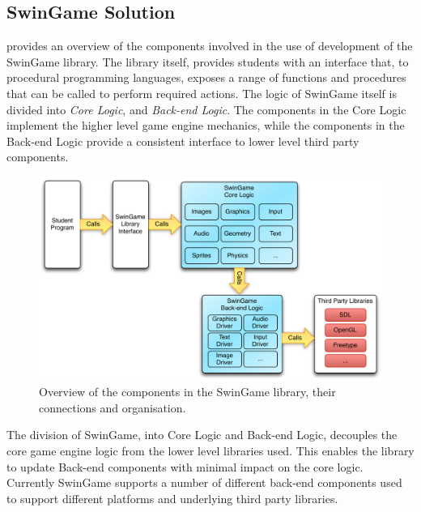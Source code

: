\clearpage
\subsection{SwinGame Solution} %
\label{sub:swingame_solution}


 provides an overview of the components involved in the use of development of the SwinGame library. The library itself, provides students with an interface that, to procedural programming languages, exposes a range of functions and procedures that can be called to perform required actions. The logic of SwinGame itself is divided into \emph{Core Logic}, and \emph{Back-end Logic}. The components in the Core Logic implement the higher level game engine mechanics, while the components in the Back-end Logic provide a consistent interface to lower level third party components.

\begin{figure}[htbp]
  \centering
  \includegraphics[width=\textwidth]{SwinGameOverview}
  \caption{Overview of the components in the SwinGame library, their connections and organisation.}
  \label{fig:swingame_overview}
\end{figure}

The division of SwinGame, into Core Logic and Back-end Logic, decouples the core game engine logic from the lower level libraries used. This enables the library to update Back-end components with minimal impact on the core logic. Currently SwinGame supports a number of different back-end components used to support different platforms and underlying third party libraries.

